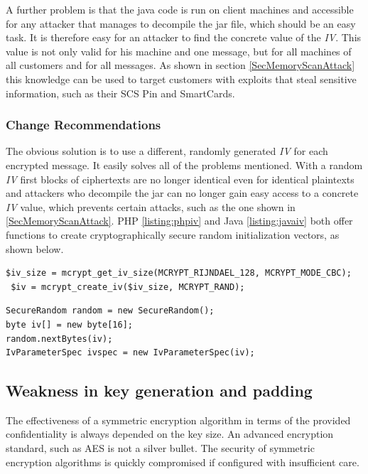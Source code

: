 \documentclass{llncs}
\begin{document}
A further problem is that the java code is run on client machines and accessible for any attacker that manages to decompile the jar file, which should be an easy task. It is therefore easy for an attacker to find the concrete value of the \emph{IV}. This value is not only valid for his machine and one message, but for all machines of all customers and for all messages. As shown in section \ref{SecMemoryScanAttack} this knowledge can be used to target customers with exploits that steal sensitive information, such as their SCS Pin and SmartCards.

\subsubsection{Change Recommendations}
The obvious solution is to use a different, randomly generated \emph{IV} for each encrypted message. It easily solves all of the problems mentioned. With a random \emph{IV} first blocks of ciphertexts are no longer identical even for identical plaintexts and attackers who decompile the jar can no longer gain easy access to a concrete \emph{IV} value, which prevents certain attacks, such as the one shown in \ref{SecMemoryScanAttack}. PHP \ref{listing:phpiv} and Java \ref{listing:javaiv} both offer functions to create cryptographically secure random initialization vectors, as shown below.

\begin{lstlisting}[caption= PHP IV generation,label=listing:phpiv]
 $iv_size = mcrypt_get_iv_size(MCRYPT_RIJNDAEL_128, MCRYPT_MODE_CBC);
 $iv = mcrypt_create_iv($iv_size, MCRYPT_RAND);
\end{lstlisting}

\begin{lstlisting}[caption= Java IV generation,label=listing:javaiv]
SecureRandom random = new SecureRandom();
byte iv[] = new byte[16];
random.nextBytes(iv);
IvParameterSpec ivspec = new IvParameterSpec(iv);
\end{lstlisting}

\subsection{Weakness in key generation and padding}
The effectiveness of a symmetric encryption algorithm in terms of the provided confidentiality is always depended on the key size. An advanced encryption standard, such as AES is not a silver bullet. The security of symmetric encryption algorithms is quickly compromised if configured with insufficient care.
\end{document}
